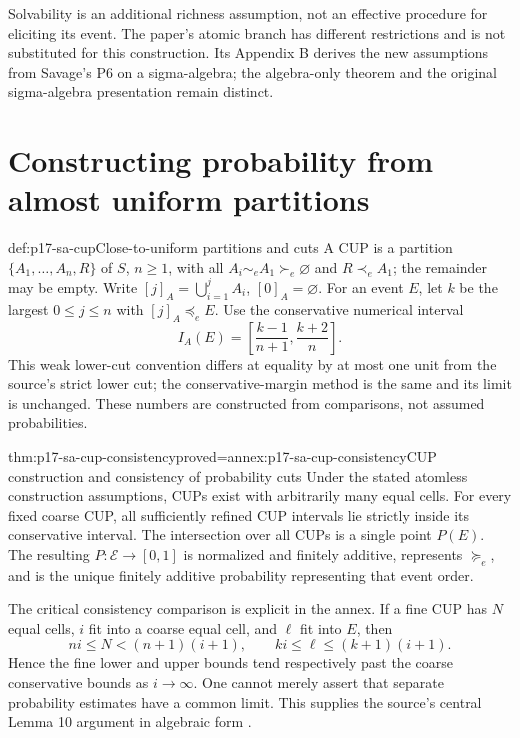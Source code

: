 Solvability is an additional richness assumption, not an
effective procedure for eliciting its event. The paper's
atomic branch has different restrictions and is not substituted
for this construction. Its Appendix B derives the new assumptions
from Savage's P6 on a sigma-algebra; the algebra-only theorem
and the original sigma-algebra presentation remain distinct.

\section{Constructing probability from almost uniform partitions}
\label{sec:p17-sa-probability}

\begin{hbdefinition}{def:p17-sa-cup}{Close-to-uniform partitions and cuts}
A CUP is a partition
\(\{A_1,\ldots,A_n,R\}\) of \(S\), \(n\geq1\), with
all \(A_i\sim_e A_1\succ_e\varnothing\) and
\(R\prec_e A_1\); the remainder may be empty.
Write \([j]_A=\bigcup_{i=1}^j A_i\), \([0]_A=\varnothing\).
For an event \(E\), let \(k\) be the largest
\(0\leq j\leq n\) with \([j]_A\preceq_e E\).
Use the conservative numerical interval
\[
 I_A(E)=\left[\frac{k-1}{n+1},\frac{k+2}{n}\right].
\]
This weak lower-cut convention differs at equality by at
most one unit from the source's strict lower cut; the
conservative-margin method is the same and its limit is unchanged.
These numbers are constructed from comparisons, not assumed
probabilities.
\end{hbdefinition}

\begin{hbtheorem}{thm:p17-sa-cup-consistency}{proved=annex:p17-sa-cup-consistency}{CUP construction and consistency of probability cuts}
Under the stated atomless construction assumptions, CUPs exist
with arbitrarily many equal cells. For every fixed coarse CUP,
all sufficiently refined CUP intervals lie strictly inside its
conservative interval. The intersection over all CUPs is a
single point \(P(E)\).
The resulting \(P:\mathcal E\to[0,1]\) is normalized and
finitely additive, represents \(\succeq_e\), and is the
unique finitely additive probability representing that event
order.
\end{hbtheorem}

The critical consistency comparison is explicit in the annex.
If a fine CUP has \(N\) equal cells, \(i\) fit into a coarse
equal cell, and \(\ell\) fit into \(E\), then
\[
 ni\leq N<(n+1)(i+1),\qquad
 ki\leq\ell\leq(k+1)(i+1).
\]
Hence the fine lower and upper bounds tend respectively
past the coarse conservative bounds as \(i\to\infty\).
One cannot merely assert that separate probability estimates
have a common limit. This supplies the source's central
Lemma 10 argument in algebraic form
\cite[pp.\ 8--11, 15--16]{AbdellaouiWakker2020SavageSA}.

